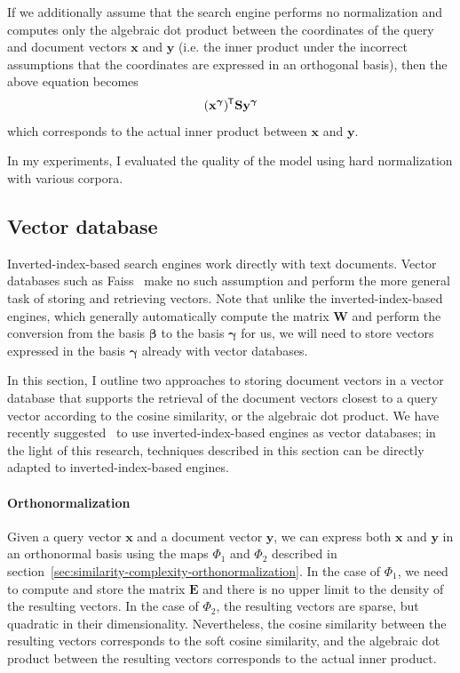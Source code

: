 \documentclass[
  digital, %
  notable, %
  lof,     %
  lot,     %
  nopalatino, color
]{fithesis3}
\newcommand*{\tran}{^{\mkern-1.5mu\mathsf{T}}}
\begin{document}
If we additionally assume that the search engine performs no normalization
and computes only the algebraic dot product between the coordinates of the
query and document vectors $\mathbf x$ and $\mathbf y$ (i.e. the inner product
under the incorrect assumptions that the coordinates are expressed in an
orthogonal basis), then the above equation becomes\begin{equation*}
  (\mathbf x^{\bm\gamma})\tran\mathbf S\mathbf y^{\bm\gamma}
\end{equation*} which corresponds to the actual inner product between $\mathbf
x$ and $\mathbf y$.

In my experiments, I evaluated the quality of the model using hard
normalization with various corpora.

\subsection{Vector database}
\label{sec:similarity-vector-db}
Inverted-index-based search engines work directly with
text documents. Vector databases such as
Faiss~\cite{JDH17} make no such assumption and perform the more
general task of storing and retrieving vectors. Note that unlike the
inverted-index-based engines, which generally automatically compute the matrix
$\mathbf W$ and perform the conversion from the basis
$\bm\beta$ to the basis
$\bm\gamma$ for us, we will need to store vectors
expressed in the basis $\bm\gamma$ already with vector
databases.

In this section, I outline two approaches to storing document vectors in
a vector database that supports the retrieval of the document vectors closest
to a query vector according to the cosine similarity,
or the algebraic dot product.
We have recently suggested~\cite{rygletal17} to use inverted-index-based
engines as vector databases; in the light of this research, techniques
described in this section can be directly adapted to inverted-index-based
engines.

\paragraph{Orthonormalization} Given a query vector $\mathbf x$ and a document
vector $\mathbf y$, we can express both $\mathbf x$ and $\mathbf y$ in an
orthonormal basis using the maps $\Phi_1$ and
$\Phi_2$ described in
section~\ref{sec:similarity-complexity-orthonormalization}. In the case of
$\Phi_1$, we need to compute and store the matrix $\mathbf E$ and there is no upper limit to the density of the resulting vectors.
In the case of $\Phi_2$, the resulting vectors are sparse, but quadratic in
their dimensionality. Nevertheless, the cosine similarity between the resulting vectors corresponds to the soft cosine
similarity, and the algebraic dot product between
the resulting vectors corresponds to the actual inner product.
\end{document}
